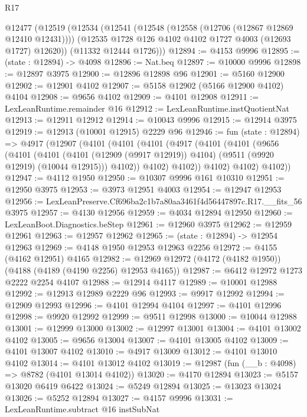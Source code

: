 \begin{lexlean}{R17}
\begin{coremodule}
  @12477
    (@12519
      (@12534
        (@12541
          (@12548 (@12558 (@12706 (@12867 @12869 @12410 @12431))))
          (@12535 @1728 @126 @4102 @4102 @1727 @4003 (@12693 @1727) @12620))
        (@11332 @12444 @1726)))
@12894 := @4153 @9996
@12895 := (state : @12894) -> @4098
@12896 := Nat.beq
@12897 := @10000 @9996
@12898 := @12897 @3975
@12900 := @12896 @12898 @96
@12901 := @5160 @12900
@12902 := @12901 @4102
@12907 := @5158 @12902 (@5166 @12900 @4102) @4104
@12908 := @9656 @4102
@12909 := @4101 @12908
@12911 := LexLeanRuntime.remainder @16
@12912 := LexLeanRuntime.instQuotientNat
@12913 := @12911 @12912
@12914 := @10043 @9996
@12915 := @12914 @3975
@12919 := @12913 (@10001 @12915) @2229 @96
@12946 := fun (state : @12894) =>
  @4917
    (@12907
      (@4101
        (@4101
          (@4101
            (@4917
              (@4101
                (@4101
                  (@9656
                    (@4101
                      (@4101
                        (@4101 (@12909 (@9917 @12919)) @4104)
                        (@9511 (@9920 @12919) (@10044 @12915)))
                      @4102))
                  @4102)
                @4102))
            @4102)
          @4102)
        @4102))
@12947 := @4112 @1950
@12950 := @10307 @9996 @161 @10310
@12951 := @12950 @3975
@12953 := @3973 @12951 @4003
@12954 := @12947 @12953
@12956 := LexLeanPreserve.Cf696ba2c1b7a80aa3461f4d56447897c.R17.__fits_56 @3975
@12957 := @4130 @12956
@12959 := @4034 @12894 @12950
@12960 := LexLeanBoot.Diagnostics.beStep
@12961 := @12960 @3975
@12962 := @12959 @12961
@12963 := @12957 @12962
@12965 := (state : @12894) -> @12954 @12963
@12969 := @4148 @1950 @12953 @12963 @2256
@12972 := @4155 (@4162 @12951) @4165
@12982 := @12969 @12972 (@4172 (@4182 @1950)) (@4188 (@4189 (@4190 @2256) @12953 @4165))
@12987 := @6412 @12972 @1273 @2222 @2254 @4107
@12988 := @12914 @4117
@12989 := @10001 @12988
@12992 := @12913 @12989 @2229 @96
@12993 := @9917 @12992
@12994 := @12909 @12993
@12996 := @4101 @12994 @4104
@12997 := @4101 @12996
@12998 := @9920 @12992
@12999 := @9511 @12998
@13000 := @10044 @12988
@13001 := @12999 @13000
@13002 := @12997 @13001
@13004 := @4101 @13002 @4102
@13005 := @9656 @13004
@13007 := @4101 @13005 @4102
@13009 := @4101 @13007 @4102
@13010 := @4917 @13009
@13012 := @4101 @13010 @4102
@13014 := @4101 @13012 @4102
@13019 := @12987 (fun (__b : @4098) => @8782 (@4101 @13014 @4102))
@13020 := @4170 @12894
@13023 := @5157 @13020 @6419 @6422
@13024 := @5249 @12894
@13025 := @13023 @13024
@13026 := @5252 @12894
@13027 := @4157 @9996
@13031 := LexLeanRuntime.subtract @16 instSubNat

\end{coremodule}
\end{lexlean}
